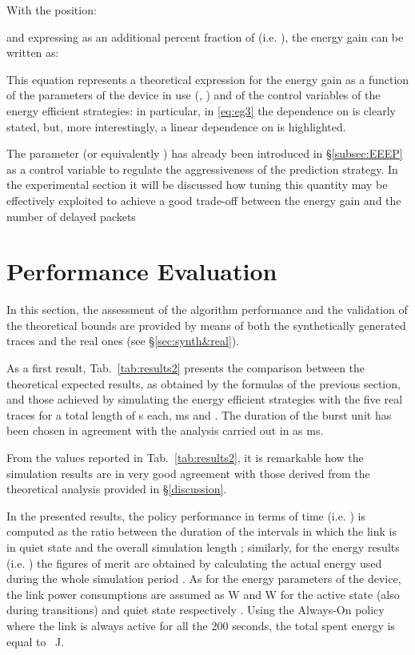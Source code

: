 \documentclass[journal,10pt,twoside,final]{IEEEtran}
\begin{document}
With the position:

and expressing  as an additional percent fraction  of  (i.e. ), the energy gain  can be written as:

This equation represents a theoretical expression for the energy gain as a function of the parameters of the device in use (, ) and of the control variables of the energy efficient strategies: in particular, in \eqref{eq:eg3} the dependence on  is clearly stated, but, more interestingly, a linear dependence on  is highlighted.

The parameter  (or equivalently ) has already been introduced in \S\ref{subsec:EEEP} as a control variable to regulate the aggressiveness of the prediction strategy.
In the experimental section it will be discussed how tuning this quantity may be effectively exploited to achieve a good trade-off between the energy gain and the number of delayed packets 

\section{Performance Evaluation}
\label{sec:performance-evaluation}

In this section, the assessment of the algorithm performance and the validation of the theoretical bounds are provided by means of both the synthetically generated traces and the real ones (see \S\ref{sec:synth&real}).

As a first result, Tab.~\ref{tab:results2} presents the comparison between the theoretical expected results, as obtained by the formulas of the previous section, and those achieved by simulating the energy efficient strategies with the five real traces for a total length of  s each,  ms and . The duration of the burst unit has been chosen in agreement with the analysis carried out in \cite{ReviriegoMaestroHernandez10} as  ms. 

From the values reported in Tab.~\ref{tab:results2}, it is remarkable how the simulation results are in very good agreement with those derived from the theoretical analysis provided in \S\ref{discussion}. 

In the presented results, the policy performance in terms of time (i.e. ) is computed as the ratio between the duration of the intervals in which the link is in quiet state and the overall simulation length ; similarly, for the energy results (i.e. ) the figures of merit are obtained by calculating the actual energy used during the whole simulation period .
As for the energy parameters of the device, the link power consumptions are assumed as  W and  W for the active state (also during transitions) and quiet state respectively \cite{intel}. Using the Always-On policy where the link is always active for all the 200 seconds, the total spent energy is equal to ~J. 
\end{document}
